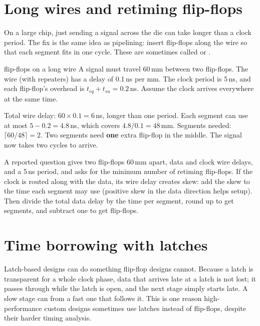 \section{Long wires and retiming flip-flops}
\label{sec:retiming}

On a large chip, just sending a signal across the die can take longer than a clock period. The fix is the same idea as pipelining: insert flip-flops along the wire so that each segment fits in one cycle. These are sometimes called  or .

\begin{worked}{flip-flops on a long wire}
A signal must travel 60\,mm between two flip-flops. The wire (with repeaters) has a delay of 0.1\,ns per mm. The clock period is 5\,ns, and each flip-flop's overhead is $t_{cq} + t_{su} = 0.2$\,ns. Assume the clock arrives everywhere at the same time.

Total wire delay: $60 \times 0.1 = 6$\,ns, longer than one period. Each segment can use at most $5 - 0.2 = 4.8$\,ns, which covers $4.8/0.1 = 48$\,mm. Segments needed: $\lceil 60/48 \rceil = 2$. Two segments need \textbf{one} extra flip-flop in the middle. The signal now takes two cycles to arrive.
\end{worked}

\begin{onoa}
A reported question gives two flip-flops 60\,mm apart, data and clock wire delays, and a 5\,ns period, and asks for the minimum number of retiming flip-flops. If the clock is routed along with the data, its wire delay creates skew: add the skew to the time each segment may use (positive skew in the data direction helps setup). Then divide the total data delay by the time per segment, round up to get segments, and subtract one to get flip-flops.
\end{onoa}

\section{Time borrowing with latches}

Latch-based designs can do something flip-flop designs cannot. Because a latch is transparent for a whole clock phase, data that arrives late at a latch is not lost; it passes through while the latch is open, and the next stage simply starts late. A slow stage can  from a fast one that follows it. This is one reason high-performance custom designs sometimes use latches instead of flip-flops, despite their harder timing analysis.

